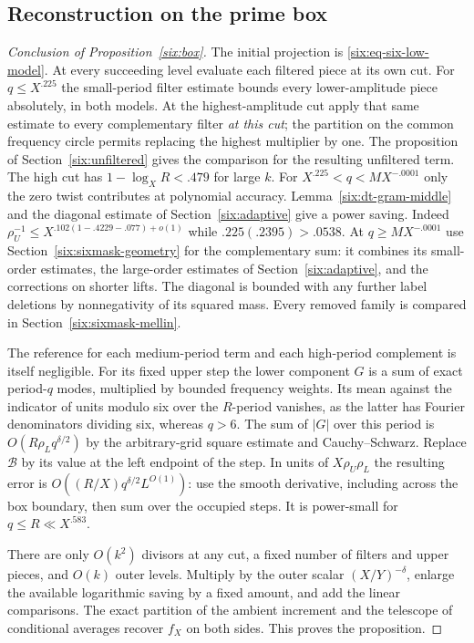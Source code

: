\documentclass[11pt,a4paper]{article}
\theoremstyle{paperplain}
\numberwithin{equation}{section}
\begin{document}
\subsection{Reconstruction on the prime box}
\begin{proof}[Conclusion of Proposition~\ref{six:box}]
The initial projection is \eqref{six:eq-six-low-model}. At every succeeding
level evaluate each filtered piece at its own cut. For $q\le X^{.225}$
the small-period filter estimate bounds every lower-amplitude piece
absolutely, in both models. At the highest-amplitude cut apply that
same estimate to every complementary filter \emph{at this cut}; the
partition on the common frequency circle permits replacing the
highest multiplier by one. The proposition of Section~\ref{six:unfiltered}
gives the comparison for the resulting unfiltered term. The high cut has
$1-\log_XR<.479$ for large $k$.
For $X^{.225}<q<MX^{-.0001}$ only the zero twist contributes at
polynomial accuracy. Lemma~\ref{six:dt-gram-middle} and the diagonal
estimate of Section~\ref{six:adaptive} give a power saving.
Indeed $\rho_U^{-1}\le X^{.102(1-.4229-.077)+o(1)}$ while
$.225(.2395)>.0538$. At $q\ge MX^{-.0001}$ use
Section~\ref{six:sixmask-geometry} for the complementary sum: it
combines its small-order estimates, the large-order estimates of
Section~\ref{six:adaptive}, and the corrections on shorter lifts.
The diagonal is bounded with any further label deletions by
nonnegativity of its squared mass. Every removed family is compared
in Section~\ref{six:sixmask-mellin}.

The reference for each medium-period term and each high-period
complement is itself negligible. For its fixed upper step the lower
component $G$ is a sum of exact period-$q$ modes, multiplied by
bounded frequency weights. Its mean against the indicator of units
modulo six over the $R$-period vanishes, as the latter has Fourier
denominators dividing six, whereas $q>6$. The sum of $|G|$ over this
period is $O(R\rho_L q^{\delta/2})$ by the arbitrary-grid square
estimate and Cauchy--Schwarz. Replace $\mathcal B$ by its value at
the left endpoint of the step. In units of $X\rho_U\rho_L$ the
resulting error is $O((R/X) q^{\delta/2} L^{O(1)})$: use the smooth
derivative, including across the box boundary, then sum over the
occupied steps. It is power-small for $q\le R\ll X^{.583}$.

There are only $O(k^2)$ divisors at any cut, a fixed number of
filters and upper pieces, and $O(k)$ outer levels. Multiply by the
outer scalar $(X/Y)^{-\delta}$, enlarge the available logarithmic
saving by a fixed amount, and add the linear comparisons. The exact
partition of the ambient increment and the telescope of conditional
averages recover $f_X$ on both sides. This proves the proposition.
\end{proof}
\end{document}
